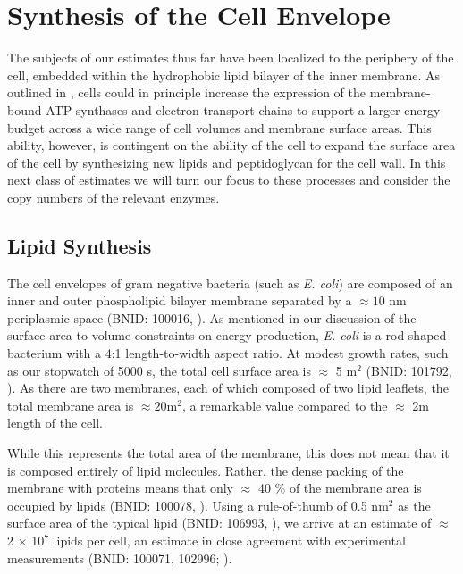 \section{Synthesis of the Cell Envelope}
The subjects of our estimates thus far have been localized to the periphery of
the cell, embedded within the hydrophobic lipid bilayer of the inner membrane.
As outlined in , cells could in principle increase the
expression of the membrane-bound ATP synthases and electron transport chains to
support a larger energy budget across a wide range of cell volumes and membrane
surface areas. This ability, however, is contingent on the ability of the cell
to expand the surface area of the cell by synthesizing new lipids and
peptidoglycan for the cell wall. In this next class of estimates we will
turn our focus to these processes and consider the copy numbers of the relevant
enzymes.

\subsection{Lipid Synthesis}
The cell envelopes of gram negative bacteria (such as \textit{E. coli}) are
composed of an inner and outer phospholipid bilayer membrane separated by a
$\approx 10$ nm periplasmic space (BNID: 100016, \cite{milo2010}). As mentioned
in our discussion of the surface area to volume constraints on energy
production, \textit{E. coli} is a rod-shaped bacterium with a 4:1
length-to-width aspect ratio. At modest growth rates, such as our stopwatch of
5000 s, the total cell surface area is $\approx$ 5 \textmu m$^2$ (BNID: 101792,
\cite{milo2010}). As there are two membranes, each of which composed of two
lipid leaflets, the total membrane area is $\approx 20$\textmu m$^2$, a
remarkable value compared to the $\approx$ 2\textmu m length of the cell.

While this represents the total area of the membrane, this does not mean that it
is composed entirely of lipid molecules. Rather, the dense packing of the
membrane with proteins means that only $\approx$ 40 \% of the membrane area is
occupied by lipids (BNID: 100078, \cite{milo2010}). Using a rule-of-thumb of 0.5
nm$^2$ as the surface area of the typical lipid (BNID: 106993, \cite{milo2010}),
we arrive at an estimate of $\approx$ 2 $\times$ 10$^7$ lipids per cell, an
estimate in close agreement with experimental measurements (BNID: 100071,
102996; \cite{milo2010}).

